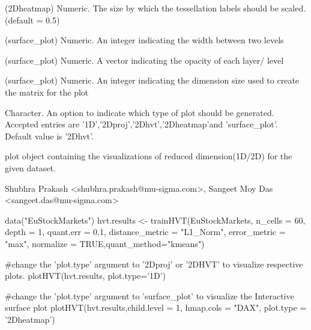 \documentclass[letterpaper]{book}
\begin{document}
\begin{Arguments}
\begin{ldescription}
\item[\code{label.size}] (2Dheatmap) Numeric. The size by which the tessellation labels should
be scaled. (default = 0.5)

\item[\code{sepration\_width}] (surface\_plot) Numeric. An integer indicating the width between two levels

\item[\code{layer\_opacity}] (surface\_plot) Numeric. A vector indicating the opacity of each layer/ level

\item[\code{dim\_size}] (surface\_plot) Numeric. An integer indicating the dimension size used to create the matrix for the plot

\item[\code{plot.type}] Character. An option to indicate which type of plot should be generated. Accepted entries are 
'1D','2Dproj','2Dhvt','2Dheatmap'and 'surface\_plot'. Default value is '2Dhvt'.
\end{ldescription}
\end{Arguments}
%
\begin{Value}
plot object containing the visualizations of reduced dimension(1D/2D) for the given dataset.
\end{Value}
%
\begin{Author}
Shubhra Prakash <shubhra.prakash@mu-sigma.com>, Sangeet Moy Das <sangeet.das@mu-sigma.com>
\end{Author}
%
\begin{SeeAlso}
\end{SeeAlso}
%
\begin{Examples}
\begin{ExampleCode}
data("EuStockMarkets")
hvt.results <- trainHVT(EuStockMarkets, n_cells = 60, depth = 1, quant.err = 0.1, 
                       distance_metric = "L1_Norm", error_metric = "max",
                       normalize = TRUE,quant_method="kmeans")
                       
#change the 'plot.type' argument to '2Dproj' or '2DHVT' to visualize respective plots.                      
plotHVT(hvt.results, plot.type='1D')

#change the 'plot.type' argument to 'surface_plot' to visualize the Interactive surface plot                   
plotHVT(hvt.results,child.level = 1, 
hmap.cols = "DAX", plot.type = '2Dheatmap')

\end{ExampleCode}
\end{Examples}
\end{document}
